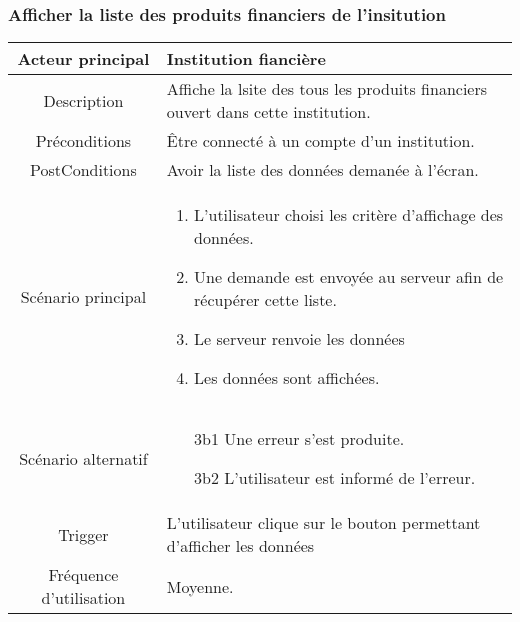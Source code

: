 \documentclass{article}
\begin{document}
\newpage

\subsubsection{Afficher la liste des produits financiers de l'insitution}
\begin{table}[h]
   \begin{tabular}{|c|p{10cm}|}
      \hline
      Acteur principal&Institution fiancière\\
      \hline
      Description&Affiche la lsite des tous les produits financiers ouvert dans cette institution.\\
      \hline
      Préconditions&Être connecté à un compte d'un institution.\\
      \hline
      PostConditions&Avoir la liste des données demanée à l'écran.\\
      \hline
      Scénario principal& 
            \begin{enumerate}
               \item L'utilisateur choisi les critère d'affichage des données.
               \item Une demande est envoyée au serveur afin de récupérer cette liste.
               \item Le serveur renvoie les données
               \item Les données sont affichées.
            \end{enumerate}     \\
      \hline
      Scénario alternatif&
            \begin{itemize}
               \item[3b1] Une erreur s'est produite.
               \item[3b2] L'utilisateur est informé de l'erreur.  
            \end{itemize}\\
      \hline
      Trigger&L'utilisateur clique sur le bouton permettant d'afficher les données\\
      \hline
      Fréquence d'utilisation&Moyenne.\\
      \hline
   \end{tabular}
\end{table}

\newpage
\end{document}
